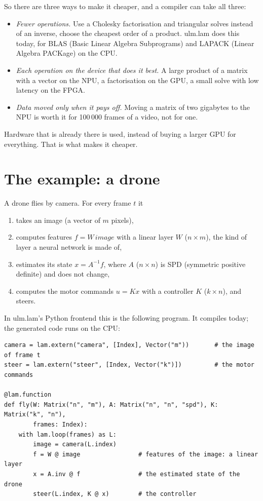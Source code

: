\documentclass[11pt,a4paper]{article}
\newcommand{\inv}{^{-1}}
\begin{document}
So there are three ways to make it cheaper, and a compiler can take all
three:
\begin{itemize}
\item \emph{Fewer operations.} Use a Cholesky factorisation and triangular
  solves instead of an inverse, choose the cheapest order of a product.
  ulm.lam does this today, for BLAS (Basic Linear Algebra Subprograms)
  and LAPACK (Linear Algebra PACKage) on the CPU.
\item \emph{Each operation on the device that does it best.} A large
  product of a matrix with a vector on the NPU, a factorisation on the GPU,
  a small solve with low latency on the FPGA.
\item \emph{Data moved only when it pays off.} Moving a matrix of two
  gigabytes to the NPU is worth it for 100\,000 frames of a video, not
  for one.
\end{itemize}
Hardware that is already there is used, instead of buying a larger GPU for
everything. That is what makes it cheaper.

\section{The example: a drone}

A drone flies by camera. For every frame \(t\) it
\begin{enumerate}
\item takes an image (a vector of \(m\) pixels),
\item computes features \(f = W\,\mathit{image}\) with a linear layer \(W\)
  (\(n\times m\)), the kind of layer a neural network is made of,
\item estimates its state \(x = A\inv f\), where \(A\) (\(n\times n\)) is
  SPD (symmetric positive definite) and does not change,
\item computes the motor commands \(u = Kx\) with a controller \(K\)
  (\(k\times n\)), and steers.
\end{enumerate}
In ulm.lam's Python frontend this is the following program. It compiles
today; the generated code runs on the CPU:

\begin{lstlisting}[style=py]
camera = lam.extern("camera", [Index], Vector("m"))       # the image of frame t
steer = lam.extern("steer", [Index, Vector("k")])         # the motor commands

@lam.function
def fly(W: Matrix("n", "m"), A: Matrix("n", "n", "spd"), K: Matrix("k", "n"),
        frames: Index):
    with lam.loop(frames) as L:
        image = camera(L.index)
        f = W @ image                # features of the image: a linear layer
        x = A.inv @ f                # the estimated state of the drone
        steer(L.index, K @ x)        # the controller
\end{lstlisting}
\end{document}
